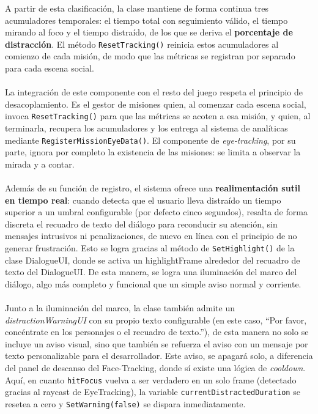 \documentclass[12pt,twoside,titlepage]{report}
\begin{document}
A partir de esta clasificación, la clase mantiene de forma continua tres acumuladores temporales: el tiempo total con seguimiento válido, el tiempo mirando al foco y el tiempo distraído, de los que se deriva el \textbf{porcentaje de distracción}.
El método \texttt{ResetTracking()} reinicia estos acumuladores al comienzo de cada misión, de modo que las métricas se registran por separado para cada escena social.\\
\\
La integración de este componente con el resto del juego respeta el principio de desacoplamiento.
Es el gestor de misiones quien, al comenzar cada escena social, invoca \texttt{ResetTracking()} para que las métricas se acoten a esa misión, y quien, al terminarla, recupera los acumuladores y los entrega al sistema de analíticas mediante \texttt{RegisterMissionEyeData()}.
El componente de \textit{eye-tracking}, por su parte, ignora por completo la existencia de las misiones: se limita a observar la mirada y a contar.
\\\\
Además de su función de registro, el sistema ofrece una \textbf{realimentación sutil en tiempo real}: cuando detecta que el usuario lleva distraído un tiempo superior a un umbral configurable (por defecto cinco segundos), resalta de forma discreta el recuadro de texto del diálogo para reconducir su atención, sin mensajes intrusivos ni penalizaciones, de nuevo en línea con el principio de no generar frustración.
Esto se logra gracias al método de \texttt{SetHighlight()} de la clase DialogueUI, donde se activa un highlightFrame alrededor del recuadro de texto del DialogueUI. De esta manera, se logra una iluminación del marco del diálogo, algo más completo y funcional que un simple aviso normal y corriente.
\\\\
Junto a la iluminación del marco, la clase también admite un \textit{distractionWarningUI} con su propio texto configurable (en este caso, ``Por favor, concéntrate en los personajes o el recuadro de texto.''), de esta manera no solo se incluye un aviso visual, sino que también se refuerza el aviso con un mensaje por texto personalizable para el desarrollador.
Este aviso, se apagará solo, a diferencia del panel de descanso del Face-Tracking, donde sí existe una lógica de \textit{cooldown}. Aquí, en cuanto \texttt{hitFocus} vuelva a ser verdadero en un solo frame (detectado gracias al raycast de EyeTracking), la variable \texttt{currentDistractedDuration} se resetea a cero y \texttt{SetWarning(false)} se dispara inmediatamente.
\end{document}
